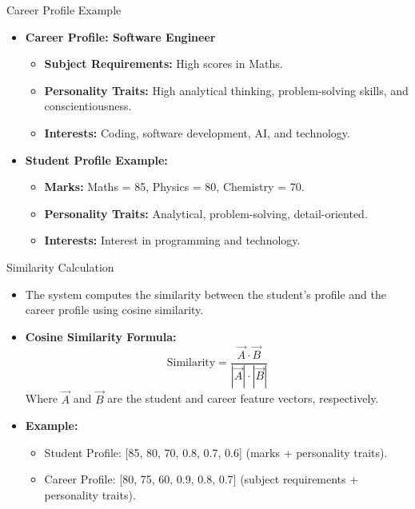 \documentclass{beamer}
\begin{document}
\begin{frame}{Career Profile Example}
    \begin{itemize}
        \item \textbf{Career Profile: Software Engineer}
        \begin{itemize}
            \item \textbf{Subject Requirements:} High scores in Maths.
            \item \textbf{Personality Traits:} High analytical thinking, problem-solving skills, and conscientiousness.
            \item \textbf{Interests:} Coding, software development, AI, and technology.
        \end{itemize}
        \item \textbf{Student Profile Example:}
        \begin{itemize}
            \item \textbf{Marks:} Maths = 85, Physics = 80, Chemistry = 70.
            \item \textbf{Personality Traits:} Analytical, problem-solving, detail-oriented.
            \item \textbf{Interests:} Interest in programming and technology.
        \end{itemize}
    \end{itemize}
\end{frame}

\begin{frame}{Similarity Calculation}
    \begin{itemize}
        \item The system computes the similarity between the student's profile and the career profile using cosine similarity.
        \item \textbf{Cosine Similarity Formula:}
        \[
        \text{Similarity} = \frac{\vec{A} \cdot \vec{B}}{|\vec{A}| \cdot |\vec{B}|}
        \]
        Where \( \vec{A} \) and \( \vec{B} \) are the student and career feature vectors, respectively.
        \item \textbf{Example:}
        \begin{itemize}
            \item Student Profile: [85, 80, 70, 0.8, 0.7, 0.6] (marks + personality traits).
            \item Career Profile: [80, 75, 60, 0.9, 0.8, 0.7] (subject requirements + personality traits).
        \end{itemize}
    \end{itemize}
\end{frame}
\end{document}
